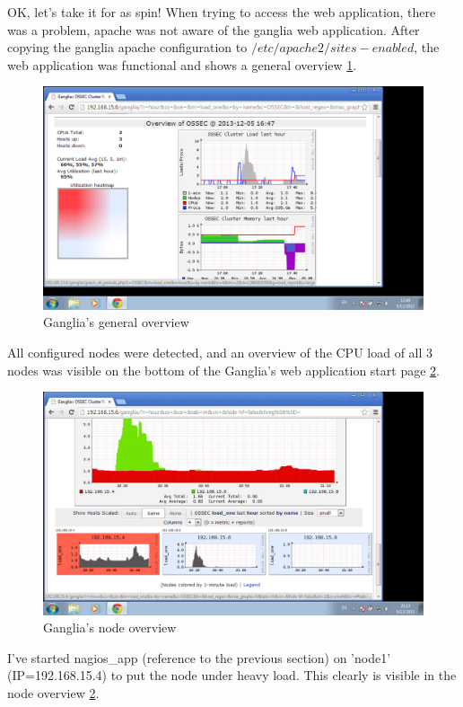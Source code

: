 \documentclass[12pt]{report}
\begin{document}
OK, let's take it for as spin! When trying to access the web
application, there was a problem, apache was not aware of the ganglia
web application. After copying the ganglia apache configuration to
$/etc/apache2/sites-enabled$, the web application was functional and
shows a general overview \cref{fig:ganglia_general}.
\begin{figure}[h!]
  \caption{Ganglia's general overview}
  \label{fig:ganglia_general}
  \centering
    \includegraphics[scale=0.3]{pics/ganglia_general.png}
\end{figure}
All configured nodes were detected, and an overview of the CPU load of
all 3 nodes was visible on the bottom of the Ganglia's web application
start page  \cref{fig:ganglia_node_overview}.
\begin{figure}[h!]
  \caption{Ganglia's node overview}
  \label{fig:ganglia_node_overview}
  \centering
    \includegraphics[scale=0.3]{pics/ganglia_node_overview.png}
\end{figure}
I've started nagios\_app (reference to the previous section) on 'node1'
(IP=192.168.15.4) to put the node under heavy load. This clearly is
visible in the node overview \cref{fig:ganglia_node_overview}.\\
\end{document}
